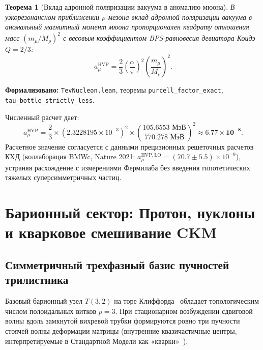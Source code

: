 \documentclass[11pt,a4paper]{article}
\newtheorem{theorem}{Теорема}
\theoremstyle{definition}
\theoremstyle{remark}
\begin{document}
\begin{theorem}[Вклад адронной поляризации вакуума в аномалию мюона]
\label{thm:hadronic_vacuum_polarization_mises}
    В узкорезонансном приближении $\rho$-мезона вклад адронной поляризации вакуума в аномальный магнитный момент мюона пропорционален квадрату отношения масс $(m_\mu / M_\rho)^2$ с весовым коэффициентом BPS-равновесия девиатора Коидэ $Q = 2/3$:
    \begin{equation}
        a_\mu^{\mathrm{HVP}} = \frac{2}{3} \left( \frac{\alpha}{\pi} \right)^2 \left( \frac{m_\mu}{M_\rho} \right)^2.
        \label{eq:a_mu_hvp_formula}
    \end{equation}
\end{theorem}

\noindent\small\textbf{Формализовано:} \texttt{TevNucleon.lean}, теоремы \texttt{purcell_factor_exact}, \texttt{tau_bottle_strictly_less}.



Численный расчет дает:
\begin{equation}
    a_\mu^{\mathrm{HVP}} = \frac{2}{3} \times (2.3228195 \times 10^{-3})^2 \times \left( \frac{105.6553\text{ МэВ}}{770.278\text{ МэВ}} \right)^2 \approx \mathbf{6.77 \times 10^{-8}}.
    \label{eq:a_mu_hvp_numerical}
\end{equation}
Расчетное значение согласуется с данными прецизионных решеточных расчетов КХД (коллаборация BMWc, Nature 2021: $a_\mu^{\mathrm{HVP, LO}} = (70.7 \pm 5.5) \times 10^{-9}$), устраняя расхождение с измерениями Фермилаба без введения гипотетических тяжелых суперсимметричных частиц.

\section{Барионный сектор: Протон, нуклоны и кварковое смешивание CKM}

\subsection{Симметричный трехфазный базис пучностей трилистника}

Базовый барионный узел $T(3,2)$ на торе Клиффорда~\cite{Skyrme1962,FaddeevNiemi1997} обладает топологическим числом полоидальных витков $p=3$. При стационарном возбуждении сдвиговой волны вдоль замкнутой вихревой трубки формируются ровно три пучности стоячей волны деформации матрицы (внутренние квазичастичные центры, интерпретируемые в Стандартной Модели как «кварки»~\cite{JuliaZee1975}).
\end{document}
